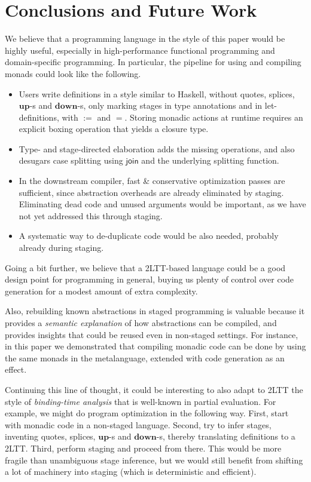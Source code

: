 \documentclass[acmsmall]{acmart}
\newcommand{\mit}[1]{{\mathsf{#1}}}
\newcommand{\mbf}[1]{{\mathbf{#1}}}
\theoremstyle{remark}
\newcommand{\mup}{\mbf{up}}
\newcommand{\mdown}{\mbf{down}}
\newcommand{\join}{\mit{join}}
\begin{document}
\section{Conclusions and Future Work}

We believe that a programming language in the style of this paper would be
highly useful, especially in high-performance functional programming and
domain-specific programming. In particular, the pipeline for using and compiling
monads could look like the following.
\begin{itemize}
\item Users write definitions in a style similar to Haskell, without quotes,
      splices, $\mup$-s and $\mdown$-s, only marking stages in type annotations and
      in let-definitions, with $:=$ and $=$.  Storing monadic actions at runtime
      requires an explicit boxing operation that yields a closure type.
\item Type- and stage-directed elaboration adds the missing operations, and also desugars
      case splitting using $\join$ and the underlying splitting function.
\item In the downstream compiler, fast \& conservative optimization passes are
      sufficient, since abstraction overheads are already eliminated by staging. Eliminating
      dead code and unused arguments would be important, as we have not yet addressed
      this through staging.
\item A systematic way to de-duplicate code would be also needed, probably already
      during staging.
\end{itemize}

Going a bit further, we believe that a 2LTT-based language could be a good design point
for programming in general, buying us plenty of control over code generation for
a modest amount of extra complexity.

Also, rebuilding known abstractions in staged programming is valuable because it
provides a \emph{semantic explanation} of how abstractions can be compiled, and
provides insights that could be reused even in non-staged settings. For
instance, in this paper we demonstrated that compiling monadic code can be done
by using the same monads in the metalanguage, extended with code
generation as an effect.

Continuing this line of thought, it could be interesting to also adapt to 2LTT
the style of \emph{binding-time analysis} that is well-known in partial
evaluation. For example, we might do program optimization in the following way.
First, start with monadic code in a non-staged language. Second, try to infer
stages, inventing quotes, splices, $\mup$-s and $\mdown$-s, thereby translating
definitions to a 2LTT. Third, perform staging and proceed from there. This would
be more fragile than unambiguous stage inference, but we would still benefit from
shifting a lot of machinery into staging (which is deterministic and efficient).
\end{document}
